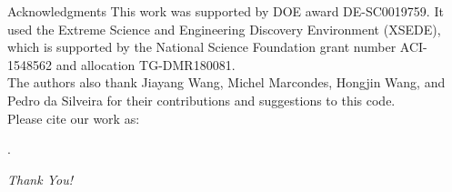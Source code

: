 \begin{frame}{Acknowledgments}
    This work was supported by DOE award DE-SC0019759. It used the Extreme
    Science and Engineering Discovery Environment (XSEDE), which is supported by
    the National Science Foundation grant number ACI-1548562 and allocation
    TG-DMR180081.\\

    The authors also thank Jiayang Wang, Michel Marcondes, Hongjin Wang, and Pedro da Silveira
    for their contributions and suggestions to this code.\\

    Please cite our work as:

    \cite{zhang2021textttexpress}.
\end{frame}

\begin{frame}[c]
    \centering \fontsize{40}{50}\selectfont\emph{Thank You!}
\end{frame}
